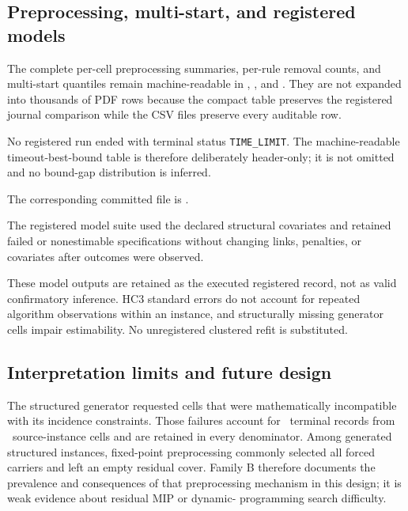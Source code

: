 \begin{landscape}

\end{landscape}

\subsection{Preprocessing, multi-start, and registered models}



The complete per-cell preprocessing summaries, per-rule removal counts, and
multi-start quantiles remain machine-readable in
,
, and
. They are not expanded into thousands of PDF
rows because the compact table preserves the registered journal comparison
while the CSV files preserve every auditable row.

No registered run ended with terminal status \texttt{TIME\_LIMIT}. The
machine-readable timeout-best-bound table is therefore deliberately
header-only; it is not omitted and no bound-gap distribution is inferred.

The corresponding committed file is
.

The registered model suite used the declared structural covariates and retained
failed or nonestimable specifications without changing links, penalties, or
covariates after outcomes were observed.

\begin{landscape}

\end{landscape}

These model outputs are retained as the executed registered record, not as
valid confirmatory inference. HC3 standard errors do not account for repeated
algorithm observations within an instance, and structurally missing generator
cells impair estimability. No unregistered clustered refit is substituted.

\subsection{Interpretation limits and future design}

The structured generator requested cells that were mathematically incompatible
with its incidence constraints. Those failures account for
\AORGenerationFailed\ terminal records from
\AORGenerationFailedInstances\ source-instance cells and are retained in every
denominator.
Among generated structured instances, fixed-point preprocessing commonly
selected all forced carriers and left an empty residual cover. Family B
therefore documents the prevalence and consequences of that preprocessing
mechanism in this design; it is weak evidence about residual MIP or dynamic-
programming search difficulty.

